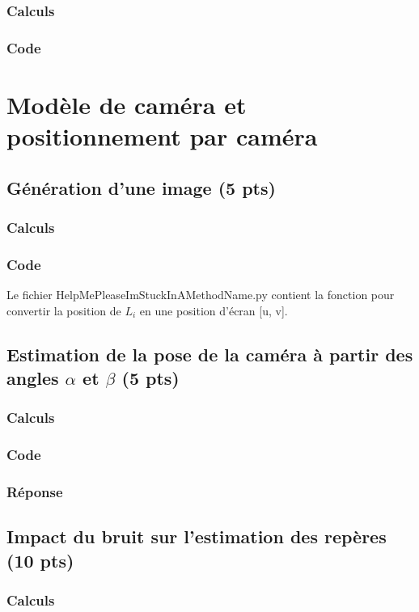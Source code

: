 \documentclass[12pt]{article}
\begin{document}
\subsubsection{Calculs}
\subsubsection{Code}

\newpage
\section{Modèle de caméra et positionnement par caméra}

\subsection{Génération d'une image (5 pts)}
\subsubsection{Calculs}
\subsubsection{Code}
Le fichier HelpMePleaseImStuckInAMethodName.py contient la fonction pour convertir la position de $L_i$ en une position d'écran [u, v].

\subsection{Estimation de la pose de la caméra à partir des angles $\alpha$ et $\beta$ (5 pts)}
\subsubsection{Calculs}
\subsubsection{Code}
\subsubsection{Réponse}

\subsection{Impact du bruit sur l'estimation des repères (10 pts)}
\subsubsection{Calculs}
\end{document}
